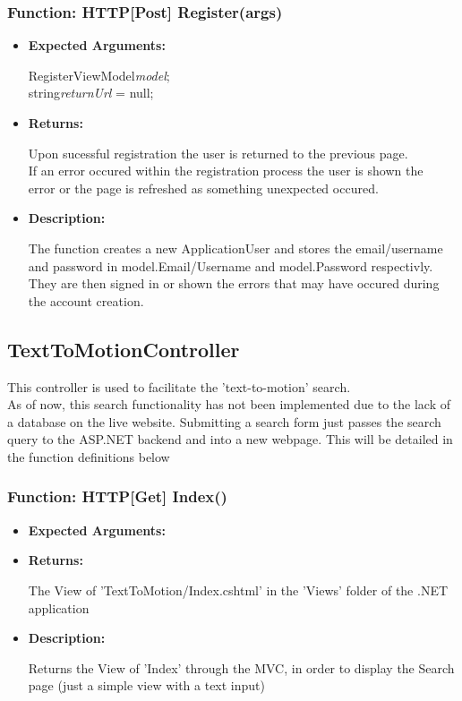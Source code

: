 \documentclass{scrreprt}
\begin{document}
\subsubsection{Function: HTTP[Post] Register(args)}
\begin{itemize}
    \item \textbf{Expected Arguments:}

    RegisterViewModel\quad\textit{model};
    \\
    string\quad\textit{returnUrl} = null;

    \item \textbf{Returns:}

    Upon sucessful registration the user is returned to the previous page.
    \\
    If an error occured within the registration process the user is shown the
    \\
    error or the page is refreshed as something unexpected occured.

    \item \textbf{Description:}

    The function creates a new ApplicationUser and stores the email/username and password in model.Email/Username and model.Password respectivly. They are then signed in or shown the errors that may have occured during the account creation.
\end{itemize}


\subsection{TextToMotionController}

This controller is used to facilitate the 'text-to-motion' search.
\\
As of now, this search functionality has not been implemented due to the lack of a database on the live website. Submitting a search form just passes the search query to the ASP.NET backend and into a new webpage. This will be detailed in the function definitions below

\subsubsection{Function: HTTP[Get] Index()}
\begin{itemize}
    \item \textbf{Expected Arguments:}
    \item \textbf{Returns:}

    The View of 'TextToMotion/Index.cshtml' in the 'Views' folder of the .NET application

    \item \textbf{Description:}

    Returns the View of 'Index' through the MVC, in order to display the Search page (just a simple view with a text input)
\end{itemize}
\end{document}
